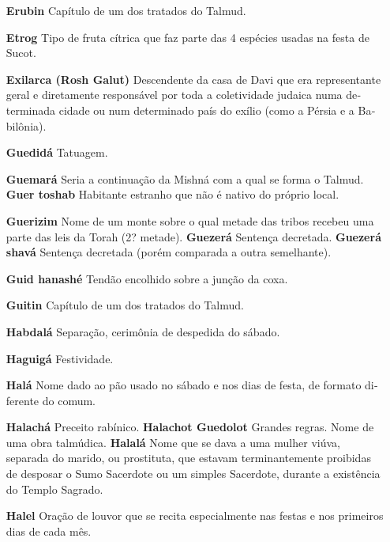 \begin{itemize}
\item[\textbf{Erubin}] Capítulo de um dos tratados do Talmud.

\item[\textbf{Etrog}] Tipo de fruta cítrica que faz parte das 4 espécies
usadas na festa de Sucot.

\item[\textbf{Exilarca (Rosh Galut)}] Descenden­te da casa de Davi que era
representan­te geral e diretamente responsável por toda a coletividade
judaica numa de­terminada cidade ou num determina­do país do exílio
(como a Pérsia e a Ba­bilônia).

\item[\textbf{Guedidá}] Tatuagem.

\item[\textbf{Guemará}] Seria a continuação da Mishná com a qual se forma o
Talmud. \textbf{Guer toshab} Habitante estranho que não é nativo do
próprio local.

\item[\textbf{Guerizim}] Nome de um monte sobre
o qual metade das tribos recebeu uma parte das leis da Torah (2?
metade). \textbf{Guezerá} Sentença decretada. \textbf{Guezerá shavá}
Sentença decreta­da (porém comparada a outra seme­lhante).

\item[\textbf{Guid hanashé}] Tendão encolhido so­bre a junção da coxa.

\item[\textbf{Guitin}] Capítulo de um dos tratados do Talmud.

\item[\textbf{Habdalá}] Separação, cerimônia de despedida do sábado.

\item[\textbf{Haguigá}] Festividade.

\item[\textbf{Halá}] Nome dado ao pão usado no sá­bado e nos dias de festa,
de formato di­ferente do comum.

\item[\textbf{Halachá} Preceito rabínico. \textbf{Halachot Guedolot}]
Grandes regras. Nome de uma obra talmúdica. \textbf{Halalá} Nome que
se dava a uma mu­lher viúva, separada do marido, ou prostituta, que
estavam terminante­mente proibidas de desposar o Sumo Sacerdote ou um
simples Sacerdote, durante a existência do Templo Sa­grado.

\item[\textbf{Halel}] Oração de louvor que se reci­ta especialmente nas
festas e nos pri­meiros dias de cada mês.


\end{itemize}
